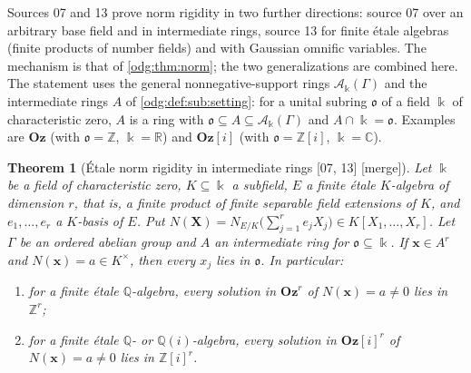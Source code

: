 \documentclass[11pt,oneside]{article}
\numberwithin{equation}{section}
\newtheorem{theorem}{Theorem}[section]
\theoremstyle{definition}
\theoremstyle{remark}
\newcommand{\Oz}{\mathbf{Oz}}
\newcommand{\Z}{\mathbb Z}
\newcommand{\Q}{\mathbb Q}
\newcommand{\R}{\mathbb R}
\newcommand{\C}{\mathbb C}
\newcommand{\src}[1]{\textup{\textsf{\small[#1]}}}
\newcommand{\mergetag}{\textup{\textsf{\small[merge]}}}
\newcommand{\Og}{\Oz[i]}
\begin{document}
Sources 07 and 13 prove norm rigidity in two further directions: source 07
over an arbitrary base field and in intermediate rings, source 13 for finite
\'etale algebras (finite products of number fields) and with Gaussian omnific
variables. The mechanism is that of \cref{odg:thm:norm}; the two
generalizations are combined here. The statement uses the general
nonnegative-support rings $\mathcal A_\Bbbk(\Gamma)$ and the intermediate rings
$A$ of \cref{odg:def:sub:setting}: for a unital subring $\mathfrak o$ of a field
$\Bbbk$ of characteristic zero, $A$ is a ring with
$\mathfrak o\subseteq A\subseteq\mathcal A_\Bbbk(\Gamma)$ and
$A\cap\Bbbk=\mathfrak o$. Examples are $\Oz$ (with $\mathfrak o=\Z$,
$\Bbbk=\R$) and $\Og$ (with $\mathfrak o=\Z[i]$, $\Bbbk=\C$).

\begin{theorem}[\'Etale norm rigidity in intermediate rings \src{07, 13} \mergetag]\label{odg:dec:thm:etale}
Let $\Bbbk$ be a field of characteristic zero, $K\subseteq\Bbbk$ a subfield,
$E$ a finite \'etale $K$-algebra of dimension $r$, that is, a finite product
of finite separable field extensions of $K$, and $e_1,\ldots,e_r$ a
$K$-basis of $E$. Put
$N(\mathbf X)=N_{E/K}\bigl(\sum_{j=1}^re_jX_j\bigr)\in K[X_1,\ldots,X_r]$.
Let $\Gamma$ be an ordered abelian group and $A$ an intermediate ring for
$\mathfrak o\subseteq\Bbbk$. If $\mathbf x\in A^r$ and $N(\mathbf x)=a\in
K^\times$, then every $x_j$ lies in $\mathfrak o$. In particular:
\begin{enumerate}[label=\textup{(\alph*)},leftmargin=*]
\item for a finite \'etale $\Q$-algebra, every solution in $\Oz^r$ of
$N(\mathbf x)=a\ne0$ lies in $\Z^r$;
\item for a finite \'etale $\Q$- or $\Q(i)$-algebra, every solution in $\Og^r$
of $N(\mathbf x)=a\ne0$ lies in $\Z[i]^r$.
\end{enumerate}
\end{theorem}
\end{document}
